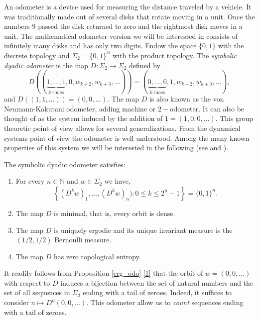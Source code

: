 \documentclass[letterpaper,10pt,reqno]{amsart}
\numberwithin{equation}{section}     %
\newcommand{\N}{\mathbb{N}}
\def\N{{\mathbb N}}
\begin{document}
An odometer  is a device used for measuring the distance traveled by a vehicle. It was traditionally made out of several disks that rotate moving in a unit. Once the numbers $9$ passed the disk returned to zero and the rightmost disk moves in a unit. The mathematical odometer version we will be interested in consists of infinitely many disks and has only two digits.  Endow the space $\{0,1\}$ with the discrete topology and $\Sigma_2= \{0,1\}^{\N}$ with the product topology.   The  {\em symbolic dyadic odometer} is the map $D: \Sigma_2 \to \Sigma_2$ defined by
\begin{equation*}
D((\underbrace{1,\dots, 1}_{k\textrm{-times}},0,w_{k+2},w_{k+3},\dots))=(\underbrace{0,\dots, 0}_{k\textrm{-times}},1,w_{k+2},w_{k+3},\dots),
\end{equation*}
and $D((1,1, \dots))=(0,0, \dots )$.  The map $D$ is also known as the von Neumann-Kakutani odometer, adding machine or $2-$odometer. It can also be thought of as the system induced by the addition of $\underline{1}=(1,0,0, \dots)$. This group theoretic point of view allows for several generalizations. From the dynamical systems point of view the odometer is  well understood. Among the many known properties of this system we will be interested in the following (see \cite[pp.25-26]{aa} and \cite[Section 4.5.2]{b}).


\begin{proposition} \label{erg_odo}
The symbolic dyadic odometer satisfies:
\begin{enumerate}
\item \label{1} For every $n \in \N$ and $w \in \Sigma_2$ we have,
\begin{equation*}
\left\{ (D^k w)_1, \dots , (D^k w)_n ): 0 \leq k \leq 2^n -1 \right\} = \{0,1\}^n.
\end{equation*}
 \item The map $D$ is minimal, that is, every orbit is dense.
 \item The map $D$ is uniquely ergodic and its unique invariant measure is the $(1/2, 1/2)$ Bernoulli measure.
\item The map $D$ has zero topological entropy.
\end{enumerate}
\end{proposition}

It readily follows from Proposition \ref{erg_odo} \eqref{1} that the orbit of $w=(0,0, \dots)$ with respect to $D$ induces  a bijection between the set of natural numbers and  the set of all sequences in $\Sigma_2$ ending with a tail of zeroes. Indeed,  it suffices to consider $n \mapsto D^n(0,0,\dots)$. This odometer allow us to \emph{count} sequences ending with a tail of zeroes.
\end{document}

